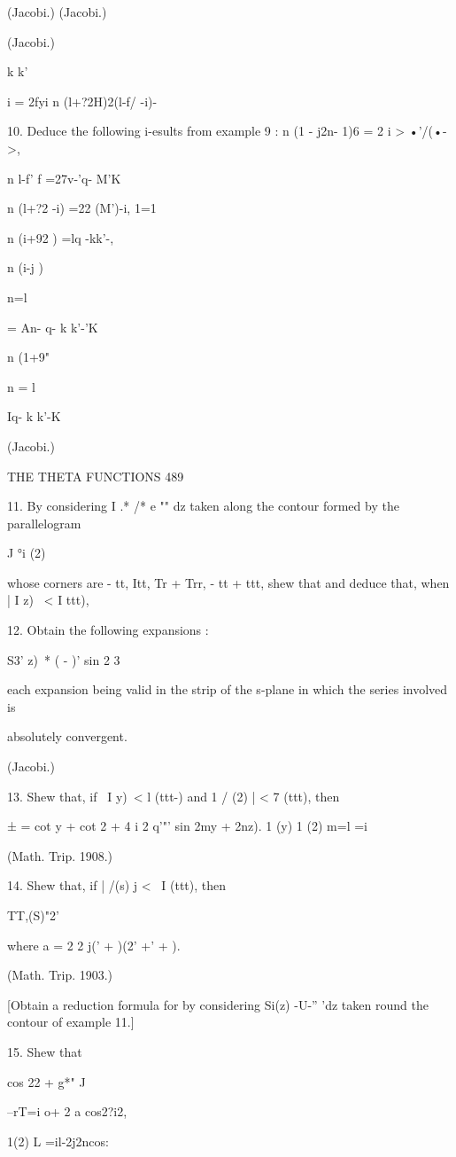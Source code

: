 (Jacobi.) (Jacobi.)

(Jacobi.)

k k'

i = 2fyi n (l+?2H)2(l-f/ -i)-

10. Deduce the following i-esults from example 9 : n (1 - j2n- 1)6 = 2
i > •'/(•->,

n l-f' f =27v-'q- M'K\

n (l+?2 -i) =22 (M')-i, 1=1

n (i+92 ) =lq -kk'-,

n (i-j )

n=l

= An- q- k k'-'K\

n (1+9"

n = l

Iq- k k'-K

(Jacobi.)

THE THETA FUNCTIONS 489

11. By considering I .* /* e "" dz taken along the contour formed by
the parallelogram

J °i (2)

whose corners are - tt, Itt, Tr + Trr, - tt + ttt, shew that and
deduce that, when | I z) \ < I ttt),

12. Obtain the following expansions :

S3' z)\ * ( - )' sin 2 3

each expansion being valid in the strip of the s-plane in which the
series involved is

absolutely convergent.

(Jacobi.)

13. Shew that, if \ I y)\ < l (ttt-) and 1 / (2) | < 7 (ttt), then

  ± = cot y + cot 2 + 4 i 2 q'"' sin 2my + 2nz). 1 (y) 1 (2) m=l =i

(Math. Trip. 1908.)

14. Shew that, if | /(s) j < \ I (ttt), then

TT,(S)"2'

where a = 2 2 j(' + )(2' +' + ).

(Math. Trip. 1903.)

[Obtain a reduction formula for by considering Si(z) -U-'' 'dz taken
round the contour of example 11.]

15. Shew that

cos 22 + g*" J

 --rT=i o+ 2 a cos2?i2,

 1(2) L =il-2j2ncos:

